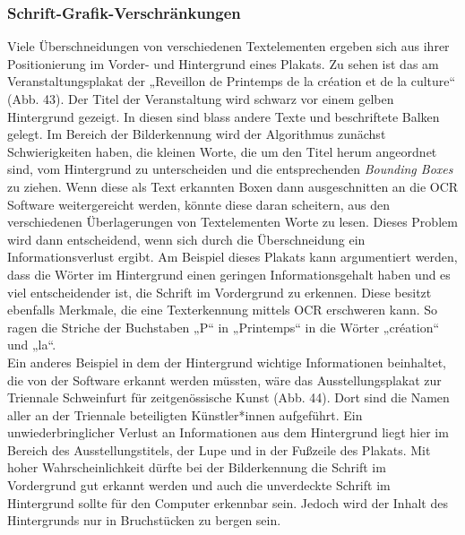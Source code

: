 \documentclass[a4paper,12pt,ngerman]{article}
\begin{document}
\subsubsection{Schrift-Grafik-Verschränkungen}
Viele Überschneidungen von verschiedenen Textelementen ergeben sich aus ihrer Positionierung im Vorder- und Hintergrund eines Plakats. Zu sehen ist das am Veranstaltungsplakat der „Reveillon de Printemps de la création et de la culture“ (Abb. 43). Der Titel der Veranstaltung wird schwarz vor einem gelben Hintergrund gezeigt. In diesen sind blass andere Texte und beschriftete Balken gelegt. Im Bereich der Bilderkennung wird der Algorithmus zunächst Schwierigkeiten haben, die kleinen Worte, die um den Titel herum angeordnet sind, vom Hintergrund zu unterscheiden und die entsprechenden \textit{Bounding Boxes} zu ziehen. Wenn diese als Text erkannten Boxen dann ausgeschnitten an die OCR Software weitergereicht werden, könnte diese daran scheitern, aus den verschiedenen Überlagerungen von Textelementen Worte zu lesen. Dieses Problem wird dann entscheidend, wenn sich durch die Überschneidung ein Informationsverlust ergibt. Am Beispiel dieses Plakats kann argumentiert werden, dass die Wörter im Hintergrund einen geringen Informationsgehalt haben und es viel entscheidender ist, die Schrift im Vordergrund zu erkennen. Diese besitzt ebenfalls Merkmale, die eine Texterkennung mittels OCR erschweren kann. So ragen die Striche der Buchstaben „P“ in „Printemps“ in die Wörter „création“ und „la“.\\
Ein anderes Beispiel in dem der Hintergrund wichtige Informationen beinhaltet, die von der Software erkannt werden müssten, wäre das Ausstellungsplakat zur Triennale Schweinfurt für zeitgenössische Kunst (Abb. 44). Dort sind die Namen aller an der Triennale beteiligten Künstler*innen aufgeführt. Ein unwiederbringlicher Verlust an Informationen aus dem Hintergrund liegt hier im Bereich des Ausstellungstitels, der Lupe und in der Fußzeile des Plakats. Mit hoher Wahrscheinlichkeit dürfte bei der Bilderkennung die Schrift im Vordergrund gut erkannt werden und auch die unverdeckte Schrift im Hintergrund sollte für den Computer erkennbar sein. Jedoch wird der Inhalt des Hintergrunds nur in Bruchstücken zu bergen sein.\\
\end{document}
